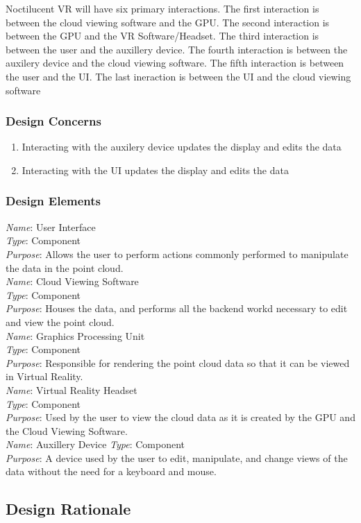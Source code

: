 \documentclass{article}
\begin{document}
Noctilucent VR will have six primary interactions.
The first interaction is between the cloud viewing software and the GPU.
The second interaction is between the GPU and the VR Software/Headset.
The third interaction is between the user and the auxillery device.
The fourth interaction is between the auxilery device and the cloud viewing software.
The fifth interaction is between the user and the UI.
The last ineraction is between the UI and the cloud viewing software

\subsubsection{Design Concerns}

\begin{enumerate}
	\item Interacting with the auxilery device updates the display and edits the data
	\item Interacting with the UI updates the display and edits the data
\end{enumerate}

\subsubsection{Design Elements}

		\textit{Name}: User Interface\\
		\textit{Type}: Component\\
		\textit{Purpose}: Allows the user to perform actions commonly performed to manipulate the data in the point cloud.\\
\newline
		\textit{Name}: Cloud Viewing Software\\
		\textit{Type}: Component\\
		\textit{Purpose}: Houses the data, and performs all the backend workd necessary to edit and view the point cloud.\\
\newline
		\textit{Name}: Graphics Processing Unit\\
		\textit{Type}: Component\\
		\textit{Purpose}: Responsible for rendering the point cloud data so that it can be viewed in Virtual Reality.\\
\newline
		\textit{Name}: Virtual Reality Headset\\
		\textit{Type}: Component\\
		\textit{Purpose}: Used by the user to view the cloud data as it is created by the GPU and the Cloud Viewing Software.\\
\newline
		\textit{Name}: Auxillery Device
		\textit{Type}: Component\\
		\textit{Purpose}: A device used by the user to edit, manipulate, and change views of the data without the need for a keyboard and mouse.

\subsection{Design Rationale}
\end{document}
